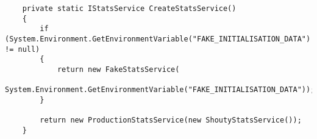 \begin{verbatim}
    private static IStatsService CreateStatsService()
    {
        if (System.Environment.GetEnvironmentVariable("FAKE_INITIALISATION_DATA") != null)
        {
            return new FakeStatsService(
                System.Environment.GetEnvironmentVariable("FAKE_INITIALISATION_DATA"));
        }
    
        return new ProductionStatsService(new ShoutyStatsService());
    }
\end{verbatim}